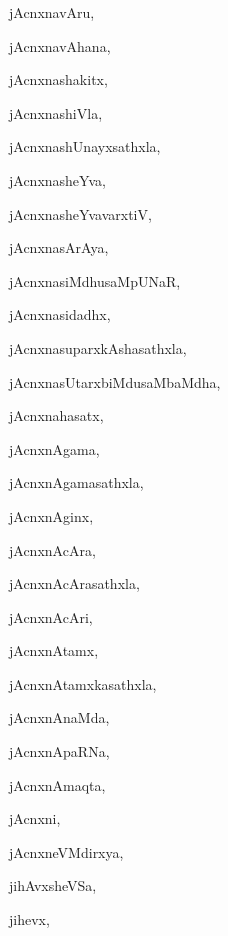 \begin{multicols}{3}
{\noindent
{jAcnxnavAru}, \pageref{jAcnxnavAru}

\noindent
{jAcnxnavAhana}, \pageref{jAcnxnavAhana}

\noindent
{jAcnxnashakitx}, \pageref{jAcnxnashakitx}

\noindent
{jAcnxnashiVla}, \pageref{jAcnxnashiVla}

\noindent
{jAcnxnashUnayxsathxla}, \pageref{jAcnxnashUnayxsathxla}

\noindent
{jAcnxnasheYva}, \pageref{jAcnxnasheYva}

\noindent
{jAcnxnasheYvavarxtiV}, \pageref{jAcnxnasheYvavarxtiV}

\noindent
{jAcnxnasArAya}, \pageref{jAcnxnasArAya}

\noindent
{jAcnxnasiMdhusaMpUNaR}, \pageref{jAcnxnasiMdhusaMpUNaR}

\noindent
{jAcnxnasidadhx}, \pageref{jAcnxnasidadhx}

\noindent
{jAcnxnasuparxkAshasathxla}, \pageref{jAcnxnasuparxkAshasathxla}

\noindent
{jAcnxnasUtarxbiMdusaMbaMdha}, \pageref{jAcnxnasUtarxbiMdusaMbaMdha}

\noindent
{jAcnxnahasatx}, \pageref{jAcnxnahasatx}

\noindent
{jAcnxnAgama}, \pageref{jAcnxnAgama}

\noindent
{jAcnxnAgamasathxla}, \pageref{jAcnxnAgamasathxla}

\noindent
{jAcnxnAginx}, \pageref{jAcnxnAginx}

\noindent
{jAcnxnAcAra}, \pageref{jAcnxnAcAra}

\noindent
{jAcnxnAcArasathxla}, \pageref{jAcnxnAcArasathxla}

\noindent
{jAcnxnAcAri}, \pageref{jAcnxnAcAri}

\noindent
{jAcnxnAtamx}, \pageref{jAcnxnAtamx}

\noindent
{jAcnxnAtamxkasathxla}, \pageref{jAcnxnAtamxkasathxla}

\noindent
{jAcnxnAnaMda}, \pageref{jAcnxnAnaMda}

\noindent
{jAcnxnApaRNa}, \pageref{jAcnxnApaRNa}

\noindent
{jAcnxnAmaqta}, \pageref{jAcnxnAmaqta}

\noindent
{jAcnxni}, \pageref{jAcnxni}

\noindent
{jAcnxneVMdirxya}, \pageref{jAcnxneVMdirxya}

\noindent
{jihAvxsheVSa}, \pageref{jihAvxsheVSa}

\noindent
{jihevx}, \pageref{jihevx}

}
\end{multicols}
